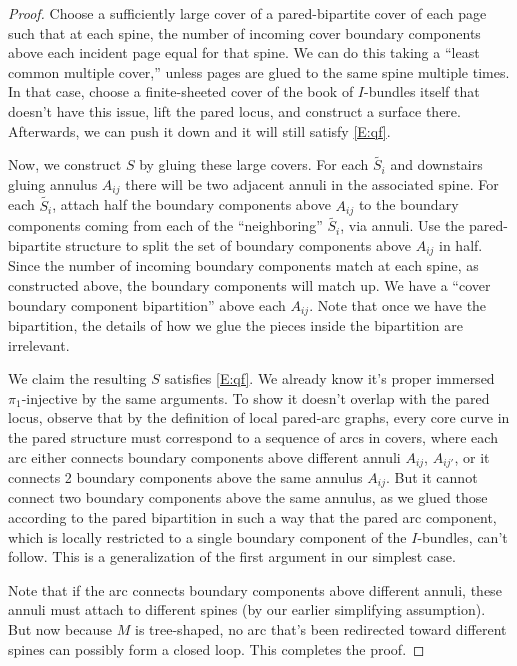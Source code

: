 \documentclass[12pt]{amsart}
\theoremstyle{definition}
\theoremstyle{remark}
\begin{document}
{\begin{proof}
Choose a sufficiently large cover of a pared-bipartite cover of each page such
that at each spine, the number of incoming cover boundary components above each
incident page equal for that spine. We can do this taking a ``least common
multiple cover,'' unless pages are glued to the same spine multiple times. In
that case, choose a finite-sheeted cover of the book of $I$-bundles itself that
doesn't have this issue, lift the pared locus, and construct a surface there.
Afterwards, we can push it down and it will still satisfy \eqref{E:qf}.


Now, we construct $S$ by gluing these large covers. For each $\widetilde{S_i}$
and downstairs gluing annulus $A_{ij}$ there will be two adjacent annuli in the
associated spine. For each $\widetilde{S_i}$, attach half the boundary
components above $A_{ij}$ to the boundary components coming from each of the
``neighboring'' $\widetilde{S_i}$, via annuli. Use the pared-bipartite
structure to split the set of boundary components above $A_{ij}$ in half. Since
the number of incoming boundary components match at each spine, as constructed
above, the boundary components will match up. We have a ``cover boundary
component bipartition'' above each $A_{ij}$. Note that once we have the
bipartition, the details of how we glue the pieces inside the bipartition are
irrelevant.

We claim the resulting $S$ satisfies \eqref{E:qf}. We already know it's proper
immersed $\pi_1$-injective by the same arguments. To show it doesn't overlap
with the pared locus, observe that by the definition of local pared-arc graphs,
every core curve in the pared structure must correspond to a sequence of arcs
in covers, where each arc either connects boundary components above different
annuli $A_{ij}$, $A_{ij'}$, or it connects 2 boundary components above the same
annulus $A_{ij}$. But it cannot connect two boundary components above the same
annulus, as we glued those according to the pared bipartition in such a way
that the pared arc component, which is locally restricted to a single boundary
component of the $I$-bundles, can't follow. This is a generalization of the
first argument in our simplest case.

Note that if the arc connects boundary components above different annuli, these
annuli must attach to different spines (by our earlier simplifying assumption).
But now because $M$ is tree-shaped, no arc that's been redirected toward
different spines can possibly form a closed loop. This completes the proof.


\end{proof}}
\end{document}

